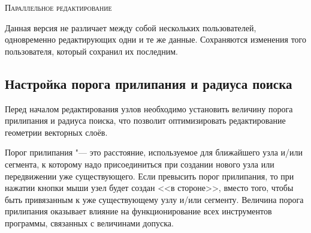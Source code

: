 \begin{Tip}\caption{\textsc{Параллельное редактирование}}
Данная версия \qg не различает между собой нескольких пользователей,
одновременно редактирующих одни и те же данные. Сохраняются изменения
того пользователя, который сохранил их последним.
\end{Tip}

\subsection{Настройка порога прилипания и радиуса поиска}\label{snapping_tolerance}

Перед началом редактирования узлов необходимо установить величину порога
прилипания и радиуса поиска, что позволит оптимизировать редактирование
геометрии векторных слоёв.


Порог прилипания "--- это расстояние, используемое \qg для 
ближайшего узла и/или сегмента, к которому надо присоединиться при создании
нового узла или передвижении уже существующего. Если превысить порог
прилипания, то при нажатии кнопки мыши узел будет создан <<в стороне>>,
вместо того, чтобы быть привязанным к уже существующему узлу и/или сегменту.
Величина порога прилипания оказывает влияние на функционирование всех
инструментов программы, связанных с величинами допуска.


